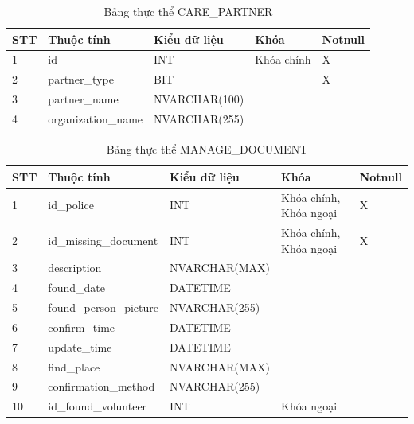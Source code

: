 \documentclass[../DoAn.tex]{subfiles}
\begin{document}
\begin{table}[H]
	\centering{}
	\begin{tabular}{m{1cm} m{4cm} m{3.5cm} m{3cm} m{1.5cm}}
		\hline
		\textbf{STT} & \textbf{Thuộc tính} & \textbf{Kiểu dữ liệu} & \textbf{Khóa} & \textbf{Notnull}
		\\ \hline
		1            & id                  & INT                   & Khóa chính    & X
		\\ \hline
		2            & partner\_type       & BIT                   &               & X
		\\ \hline
		3            & partner\_name       & NVARCHAR(100)         &               &
		\\ \hline
		4            & organization\_name  & NVARCHAR(255)         &               &
		\\ \hline
	\end{tabular}
	\caption{Bảng thực thể CARE\_PARTNER}
\end{table}

\begin{table}[H]
	\centering{}
	\begin{tabular}{m{1cm} m{4cm} m{3.5cm} m{3cm} m{1.5cm}}
		\hline
		\textbf{STT} & \textbf{Thuộc tính}    & \textbf{Kiểu dữ liệu} & \textbf{Khóa}          & \textbf{Notnull}
		\\ \hline
		1            & id\_police             & INT                   & Khóa chính, Khóa ngoại & X
		\\ \hline
		2            & id\_missing\_document  & INT                   & Khóa chính, Khóa ngoại & X
		\\ \hline
		3            & description            & NVARCHAR(MAX)         &                        &
		\\ \hline
		4            & found\_date            & DATETIME              &                        &
		\\ \hline
		5            & found\_person\_picture & NVARCHAR(255)         &                        &
		\\ \hline
		6            & confirm\_time          & DATETIME              &                        &
		\\ \hline
		7            & update\_time           & DATETIME              &                        &
		\\ \hline
		8            & find\_place            & NVARCHAR(MAX)         &                        &
		\\ \hline
		9            & confirmation\_method   & NVARCHAR(255)         &                        &
		\\ \hline
		10           & id\_found\_volunteer   & INT                   & Khóa ngoại             &
		\\ \hline
	\end{tabular}
	\caption{Bảng thực thể MANAGE\_DOCUMENT}
\end{table}
\end{document}
